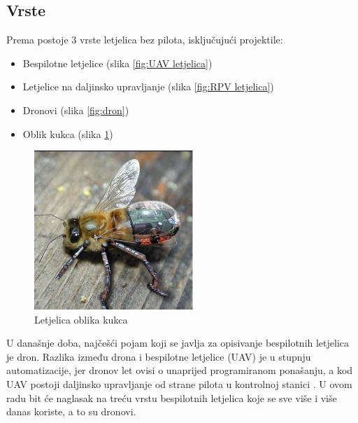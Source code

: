 \documentclass[times, utf8, diplomski]{fer}
\begin{document}
\subsection{Vrste}
Prema \citet{UAVSystems} postoje  3  vrste  letjelica  bez  pilota,  isključujući 
projektile: \begin{itemize}
\item Bespilotne letjelice  (slika \ref{fig:UAV letjelica})
\item Letjelice na daljinsko upravljanje  (slika \ref{fig:RPV letjelica})
\item Dronovi  (slika \ref{fig:dron})
\item Oblik kukca  (slika \ref{fig:oblik kukca})
\end{itemize}
\begin{figure}[htb]
\centering
\includegraphics[width=6cm]{img/insect_fly_shaped_drone.png}
\caption{Letjelica oblika kukca\protect\footnotemark}
\label{fig:oblik kukca}
\end{figure}
U današnje doba, najčešći pojam koji se javlja za opisivanje bespilotnih letjelica je dron. Razlika između drona i bespilotne letjelice (UAV) je u stupnju automatizacije, jer dronov let ovisi o unaprijed programiranom ponašanju, a kod UAV postoji daljinsko upravljanje od strane pilota  u  kontrolnoj  stanici \citep{UAVInsider}. U ovom radu bit će naglasak na treću vrstu bespilotnih letjelica koje se sve više i više danas koriste, a to su dronovi. 
\end{document}
